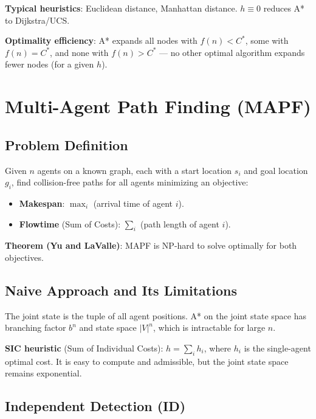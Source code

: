 \documentclass[11pt,a4paper]{article}
\theoremstyle{definition}
\theoremstyle{plain}
\theoremstyle{remark}
\begin{document}
\textbf{Typical heuristics}: Euclidean distance, Manhattan distance. $h \equiv 0$ reduces A* to Dijkstra/UCS.

\textbf{Optimality efficiency}: A* expands all nodes with $f(n) < C^*$, some with $f(n) = C^*$, and none with $f(n) > C^*$ — no other optimal algorithm expands fewer nodes (for a given $h$).

\section{Multi-Agent Path Finding (MAPF)}

\subsection{Problem Definition}

\begin{tcolorbox}[colback=blue!5!white,colframe=blue!75!black,title=\textbf{MAPF Problem}]
Given $n$ agents on a known graph, each with a start location $s_i$ and goal location $g_i$, find collision-free paths for all agents minimizing an objective:
\begin{itemize}
    \item \textbf{Makespan}: $\max_i$ (arrival time of agent $i$).
    \item \textbf{Flowtime} (Sum of Costs): $\sum_i$ (path length of agent $i$).
\end{itemize}
\textbf{Theorem (Yu and LaValle)}: MAPF is NP-hard to solve optimally for both objectives.
\end{tcolorbox}

\subsection{Naive Approach and Its Limitations}

The joint state is the tuple of all agent positions. A* on the joint state space has branching factor $b^n$ and state space $|V|^n$, which is intractable for large $n$.

\textbf{SIC heuristic} (Sum of Individual Costs): $h = \sum_i h_i$, where $h_i$ is the single-agent optimal cost. It is easy to compute and admissible, but the joint state space remains exponential.

\subsection{Independent Detection (ID)}
\end{document}
